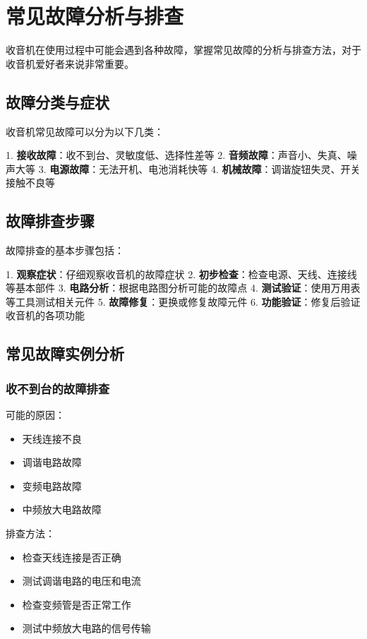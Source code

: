 \documentclass[12pt,UTF8]{ctexbook}
\begin{document}
\chapter{常见故障分析与排查}

收音机在使用过程中可能会遇到各种故障，掌握常见故障的分析与排查方法，对于收音机爱好者来说非常重要。

\section{故障分类与症状}

收音机常见故障可以分为以下几类：

1. \textbf{接收故障}：收不到台、灵敏度低、选择性差等
2. \textbf{音频故障}：声音小、失真、噪声大等
3. \textbf{电源故障}：无法开机、电池消耗快等
4. \textbf{机械故障}：调谐旋钮失灵、开关接触不良等

\section{故障排查步骤}

故障排查的基本步骤包括：

1. \textbf{观察症状}：仔细观察收音机的故障症状
2. \textbf{初步检查}：检查电源、天线、连接线等基本部件
3. \textbf{电路分析}：根据电路图分析可能的故障点
4. \textbf{测试验证}：使用万用表等工具测试相关元件
5. \textbf{故障修复}：更换或修复故障元件
6. \textbf{功能验证}：修复后验证收音机的各项功能

\section{常见故障实例分析}

\subsection{收不到台的故障排查}

可能的原因：\begin{itemize}
  \item 天线连接不良
  \item 调谐电路故障
  \item 变频电路故障
  \item 中频放大电路故障\end{itemize}

排查方法：\begin{itemize}
  \item 检查天线连接是否正确
  \item 测试调谐电路的电压和电流
  \item 检查变频管是否正常工作
  \item 测试中频放大电路的信号传输\end{itemize}
\end{document}
